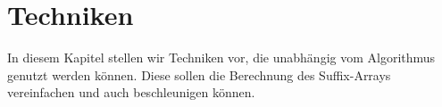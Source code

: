 \section{Techniken}
In diesem Kapitel stellen wir Techniken vor, die unabhängig vom Algorithmus genutzt werden können. Diese sollen die Berechnung des Suffix-Arrays vereinfachen und auch beschleunigen können. 



